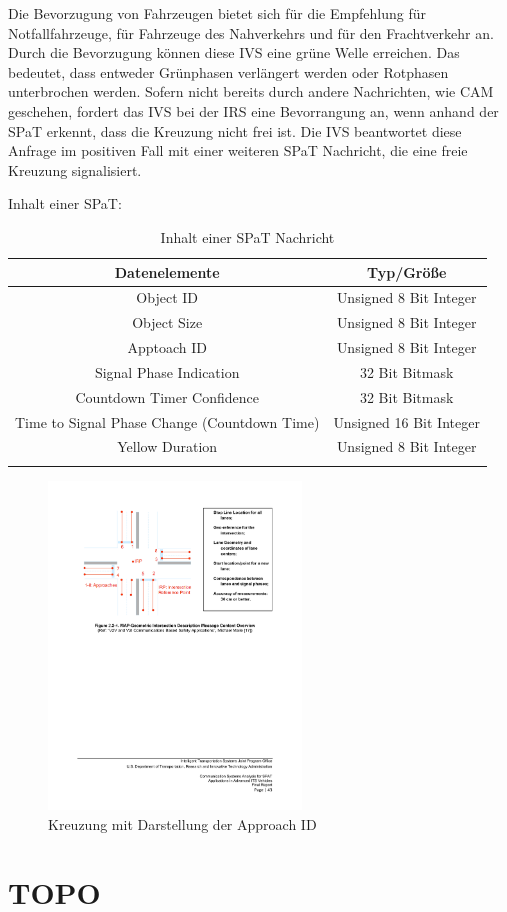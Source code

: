 Die Bevorzugung von Fahrzeugen bietet sich für die Empfehlung \cite{usSpat} für Notfallfahrzeuge, für Fahrzeuge des Nahverkehrs und für den Frachtverkehr an. Durch die Bevorzugung können diese \ac{IVS} eine grüne Welle erreichen. Das bedeutet, dass entweder Grünphasen verlängert werden oder Rotphasen unterbrochen werden. Sofern nicht bereits durch andere Nachrichten, wie \ac{CAM} geschehen, fordert das \ac{IVS} bei der \ac{IRS} eine Bevorrangung an, wenn anhand der \ac{SPaT} erkennt, dass die Kreuzung nicht frei ist. Die \ac{IVS} beantwortet diese Anfrage im positiven Fall mit einer weiteren \ac{SPaT} Nachricht, die eine freie Kreuzung signalisiert.   

Inhalt einer \ac{SPaT}:
\begin{longtable}{|c|c|}
 \hline
\textbf{Datenelemente} & \textbf{Typ/Größe}\\
 \hline
 \hline
Object ID & Unsigned 8 Bit Integer\\
 \hline
 Object Size& Unsigned 8 Bit Integer\\
 \hline
 Apptoach ID & Unsigned 8 Bit Integer\\
 \hline
 Signal Phase Indication &  32 Bit Bitmask \\
 \hline
 Countdown Timer Confidence & 32 Bit Bitmask \\
 \hline
 Time to Signal Phase Change (Countdown Time) & Unsigned 16 Bit Integer \\
 \hline
 Yellow Duration & Unsigned 8 Bit Integer\\
 \hline
 \caption{Inhalt einer SPaT Nachricht \cite{usSpat}}
 \label{tab:facilitylayer_inhaltSpatNachricht}
 \end{longtable}
 
\begin{figure}[htbp]
	\includegraphics[width=0.60\textwidth]{content/images/04_facilitylayer/spatKreuzung-Anfahrtsstreifen.pdf}
	\caption{Kreuzung mit Darstellung der Approach ID \cite{usSpat}}
	\label{fig:darstellungKreuzung}
\end{figure}




\section{TOPO\label{sec:topo}}
